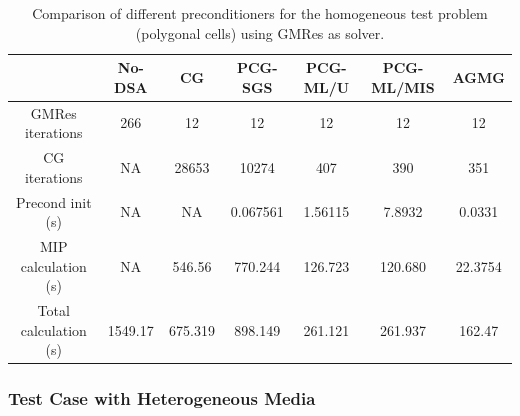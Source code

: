 \documentclass[preprint,10pt]{elsarticle}
\renewcommand{\(}{\left(}
\renewcommand{\)}{\right)}
\renewcommand{\[}{\left[}
\renewcommand{\]}{\right]}
\begin{document}
\begin{table}[!htbp]
  \begin{center}
    \caption{Comparison of different preconditioners for the homogeneous test
    problem (polygonal cells) using GMRes as solver.}
    \begin{tabular}{|c|c|c|c|c|c|c|}
      \hline
      & No-DSA & CG & PCG-SGS & PCG-ML/U & PCG-ML/MIS & AGMG \\
      \hline
      GMRes iterations& 266    & 12      & 12      & 12      & 12      & 12 \\
      CG iterations   & NA     & 28653   & 10274   & 407     & 390     & 351\\
\hline
   Precond init (s)   & NA      & NA      & 0.067561& 1.56115 & 7.8932  & 0.0331  \\
MIP calculation (s)   & NA      & 546.56  & 770.244 & 126.723 & 120.680 & 22.3754 \\
Total calculation (s) & 1549.17 & 675.319 & 898.149 & 261.121 & 261.937 & 162.47  \\
      \hline
    \end{tabular}
    \label{comparison_homog_poly_gmres}
  \end{center}
\end{table}

\pagebreak
\newpage

\subsubsection{Test Case with Heterogeneous Media}
\end{document}
